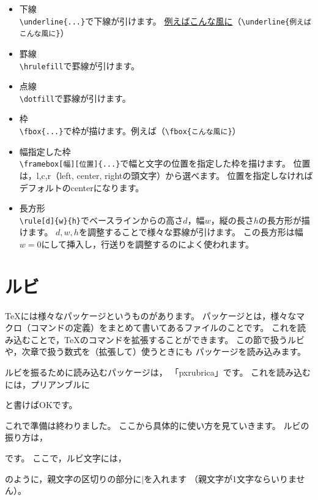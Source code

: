 \begin{itemize}
\item 下線 \\
\verb|\underline{...}|で下線が引けます。
\underline{例えばこんな風に}（\verb|\underline{例えばこんな風に}|）

\item 罫線 \\
\verb|\hrulefill|で罫線が引けます。\\
\hrulefill

\item 点線 \\
\verb|\dotfill|で罫線が引けます。\\
\dotfill

\item 枠 \\
\verb|\fbox{...}|で枠が描けます。例えば（\verb|\fbox{こんな風に}|）

\item 幅指定した枠 \\
\verb|\framebox[幅][位置]{...}|で幅と文字の位置を指定した枠を描けます。
位置は，l,c,r（left, center, rightの頭文字）から選べます。
位置を指定しなければデフォルトのcenterになります。

\item 長方形 \\
\verb|\rule[d]{w}{h}|でベースラインからの高さ$d$，幅$w$，縦の長さ$h$の長方形が描けます。
$d,w,h$を調整することで様々な罫線が引けます。
この長方形は幅$w = 0$にして挿入し，行送りを調整するのによく使われます。
\end{itemize}



\section{ルビ}
{\TeX}には様々なパッケージというものがあります。
パッケージとは，様々なマクロ（コマンドの定義）をまとめて書いてあるファイルのことです。
これを読み込むことで，{\TeX}のコマンドを拡張することができます。
この節で扱うルビや，次章で扱う数式を（拡張して）使うときにも
パッケージを読み込みます。

ルビを振るために読み込むパッケージは，
「pxrubrica」です。
これを読み込むには，プリアンブルに
\begin{ITeX}
\usepackage{pxrubrica}
\end{ITeX}
と書けばOKです。

これで準備は終わりました。
ここから具体的に使い方を見ていきます。
ルビの振り方は，
\begin{ITeX}
\end{ITeX}
です。
ここで，ルビ文字には，
\begin{ITeX}
\end{ITeX}
のように，親文字の区切りの部分に$|$を入れます
（親文字が1文字ならいりません）。

